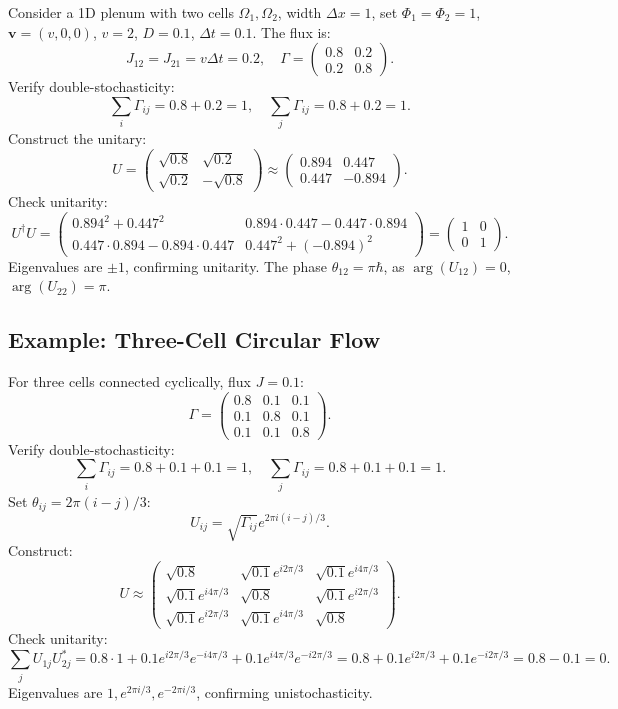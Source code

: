 \documentclass[12pt]{article}
\begin{document}
Consider a 1D plenum with two cells \(\Omega_1, \Omega_2\), width \(\Delta x = 1\), set \(\Phi_1 = \Phi_2 = 1\), \(\mathbf{v} = (v, 0, 0)\), \(v = 2\), \(D = 0.1\), \(\Delta t = 0.1\). The flux is:
\[
J_{12} = J_{21} = v \Delta t = 0.2, \quad \Gamma = \begin{pmatrix} 0.8 & 0.2 \\ 0.2 & 0.8 \end{pmatrix}.
\]
Verify double-stochasticity:
\[
\sum_i \Gamma_{ij} = 0.8 + 0.2 = 1, \quad \sum_j \Gamma_{ij} = 0.8 + 0.2 = 1.
\]
Construct the unitary:
\[
U = \begin{pmatrix} \sqrt{0.8} & \sqrt{0.2} \\ \sqrt{0.2} & -\sqrt{0.8} \end{pmatrix} \approx \begin{pmatrix} 0.894 & 0.447 \\ 0.447 & -0.894 \end{pmatrix}.
\]
Check unitarity:
\[
U^\dagger U = \begin{pmatrix} 0.894^2 + 0.447^2 & 0.894 \cdot 0.447 - 0.447 \cdot 0.894 \\ 0.447 \cdot 0.894 - 0.894 \cdot 0.447 & 0.447^2 + (-0.894)^2 \end{pmatrix} = \begin{pmatrix} 1 & 0 \\ 0 & 1 \end{pmatrix}.
\]
Eigenvalues are \(\pm 1\), confirming unitarity. The phase \(\theta_{12} = \pi \hbar\), as \(\arg(U_{12}) = 0\), \(\arg(U_{22}) = \pi\).

\subsection{Example: Three-Cell Circular Flow}

For three cells connected cyclically, flux \(J = 0.1\):
\[
\Gamma = \begin{pmatrix} 0.8 & 0.1 & 0.1 \\ 0.1 & 0.8 & 0.1 \\ 0.1 & 0.1 & 0.8 \end{pmatrix}.
\]
Verify double-stochasticity:
\[
\sum_i \Gamma_{ij} = 0.8 + 0.1 + 0.1 = 1, \quad \sum_j \Gamma_{ij} = 0.8 + 0.1 + 0.1 = 1.
\]
Set \(\theta_{ij} = 2\pi (i - j) / 3\):
\[
U_{ij} = \sqrt{\Gamma_{ij}} e^{2\pi i (i - j) / 3}.
\]
Construct:
\[
U \approx \begin{pmatrix} \sqrt{0.8} & \sqrt{0.1} e^{i 2\pi / 3} & \sqrt{0.1} e^{i 4\pi / 3} \\ \sqrt{0.1} e^{i 4\pi / 3} & \sqrt{0.8} & \sqrt{0.1} e^{i 2\pi / 3} \\ \sqrt{0.1} e^{i 2\pi / 3} & \sqrt{0.1} e^{i 4\pi / 3} & \sqrt{0.8} \end{pmatrix}.
\]
Check unitarity:
\[
\sum_j U_{1j} U_{2j}^* = 0.8 \cdot 1 + 0.1 e^{i 2\pi / 3} e^{-i 4\pi / 3} + 0.1 e^{i 4\pi / 3} e^{-i 2\pi / 3} = 0.8 + 0.1 e^{i 2\pi / 3} + 0.1 e^{-i 2\pi / 3} = 0.8 - 0.1 = 0.
\]
Eigenvalues are \(1, e^{2\pi i / 3}, e^{-2\pi i / 3}\), confirming unistochasticity.
\end{document}
